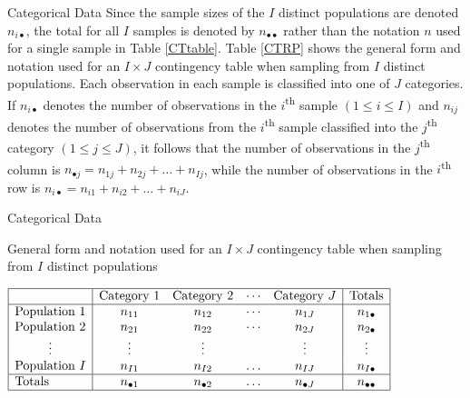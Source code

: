 \documentclass[
  ignorenonframetext,
]{beamer}
\begin{document}
\begin{frame}{Categorical Data}
\protect\hypertarget{categorical-data-4}{}
Since the sample sizes of the \(I\) distinct populations are denoted
\(n_{i\bullet}\), the total for all \(I\) samples is denoted by
\(n_{\bullet\bullet}\) rather than the notation \(n\) used for a single
sample in Table \ref{CTtable}. Table \ref{CTRP} shows the general form
and notation used for an \(I \times J\) contingency table when sampling
from \(I\) distinct populations. Each observation in each sample is
classified into one of \(J\) categories. If \(n_{i\bullet}\) denotes the
number of observations in the \(i\)\textsuperscript{th} sample
\((1 \le i \le I)\) and \(n_{ij}\) denotes the number of observations
from the \(i\)\textsuperscript{th} sample classified into the
\(j\)\textsuperscript{th} category \((1 \le j \le J)\), it follows that
the number of observations in the \(j\)\textsuperscript{th} column is
\(n_{\bullet j}=n_{1j}+n_{2j}+\dots+n_{Ij}\), while the number of
observations in the \(i\)\textsuperscript{th} row is
\(n_{i\bullet}=n_{i1}+n_{i2}+\dots+n_{iJ}\).
\end{frame}

\begin{frame}{Categorical Data}
\protect\hypertarget{categorical-data-5}{}
\begin{table}[!ht]\caption{General form and
notation used for an $I \times J$ contingency table when sampling from $I$
distinct populations\label{CTRP}}
\medskip
\setlength{\extrarowheight}{4pt}
\setlength{\arraycolsep}{2mm}
\centerline{
$
\begin{array}{|l|*{4}{c}|c|}
\hline
&\text{Category }1&\text{Category }2&\cdots&\text{Category }J&\text{Totals}\\ \hline
\text{Population }1&n_{11}&n_{12}&\cdots&n_{1J}&n_{1\bullet}\\
\text{Population } 2&n_{21}&n_{22}&\cdots&n_{2J}&n_{2\bullet}\\
\hfill\vdots\hfill&\vdots&\vdots&&\vdots&\vdots\\
\text{Population } I&n_{I1}&n_{I2}&\dotsc&n_{IJ}&n_{I\bullet}\\
\hline
\text{Totals}&n_{\bullet 1}&n_{\bullet 2}&\dotsc&n_{\bullet J}&n_{\bullet\bullet}\\
\hline
\end{array}
$}\setlength{\extrarowheight}{0pt}\setlength{\arraycolsep}{1.5pt}
\end{table}
\end{frame}
\end{document}
